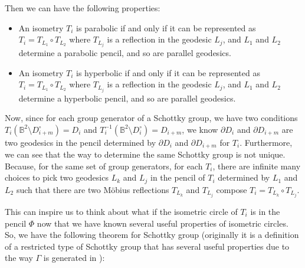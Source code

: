 \documentclass[12pt,oneside]{sfsuthesis}
\theoremstyle{plain} %
\theoremstyle{definition}  %
\theoremstyle{remark}  %
\theoremstyle{plain}
\begin{document}
{Then we can have the following properties\cite[section 7.32, 7.34]{beardon2012geometry}:
\begin{itemize}
\item An isometry $T_i$ is parabolic if and only if it can be represented as $T_i=T_{L_{1}}\circ T_{L_{2}}$ where $T_{L_{j}}$ is a reflection in the geodesic $L_j$, and $L_1$ and $L_2$ determine a parabolic pencil, and so are parallel geodesics.
\item An isometry $T_i$ is hyperbolic if and only if it can be represented as $T_i=T_{L_{1}}\circ T_{L_{2}}$ where $T_{L_{j}}$ is a reflection in the geodesic $L_j$, and $L_1$ and $L_2$ determine a hyperbolic pencil, and so are parallel geodesics.
\end{itemize}

Now, since for each group generator of a Schottky group, we have two conditions $T_i (\mathbb{B}^2\setminus D^{\circ}_{i+m}) = D_{i}$ and $T_i^{-1}\left( \mathbb{B}^2\setminus D^{\circ}_{i}\right)=D_{i+m}$, we know $\partial D_i$ and $\partial D_{i+m}$ are two geodesics in the pencil determined by $\partial D_i$ and $\partial D_{i+m}$ for $T_i$. Furthermore, we can see that the way to determine the same Schottky group is not unique. Because, for the same set of group generators, for each $T_i$, there are infinite many choices to pick two geodesics $L_k$ and $L_j$ in the pencil of $T_i$ determined by $L_1$ and $L_2$ such that there are two M\"{o}bius reflections $T_{L_{k}}$ and $T_{L_{j}}$ compose $T_i=T_{L_{k}}\circ T_{L_{j}}$.

This can inspire us to think about what if the isometric circle of $T_i$ is in the pencil $\Phi$ now that we have known several useful properties of isometric circles. So, we have the following theorem for Schottky group (originally it is a definition of a restricted type of Schottky group that has several useful properties due to the way $\Gamma$ is generated in \cite{dal2010geodesic}):

}
\end{document}
